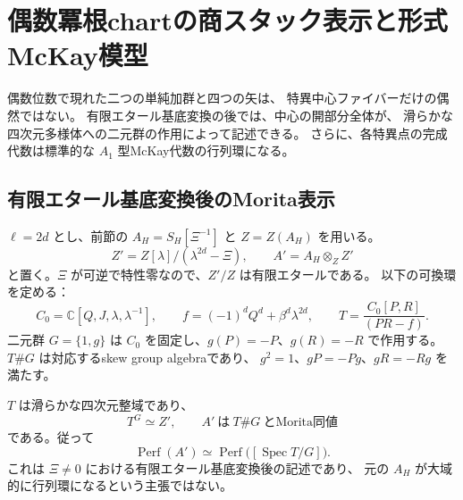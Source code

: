 \section{偶数冪根chartの商スタック表示と形式McKay模型}
\label{sec:root-McKay-v38}

偶数位数で現れた二つの単純加群と四つの矢は、
特異中心ファイバーだけの偶然ではない。
有限エタール基底変換の後では、中心の開部分全体が、
滑らかな四次元多様体への二元群の作用によって記述できる。
さらに、各特異点の完成代数は標準的な $A_1$ 型McKay代数の行列環になる。

\subsection{有限エタール基底変換後のMorita表示}

$\ell=2d$ とし、前節の $A_H=S_H[\Xi^{-1}]$ と $Z=Z(A_H)$ を用いる。
\[
 Z'=Z[\lambda]/(\lambda^{2d}-\Xi),\qquad
 A'=A_H\otimes_Z Z'
\]
と置く。$\Xi$ が可逆で特性零なので、$Z'/Z$ は有限エタールである。
以下の可換環を定める：
\begin{equation}
\label{eq:root-smooth-cover-v38}
 C_0=\mathbb C[Q,J,\lambda,\lambda^{-1}],\qquad
 f=(-1)^dQ^d+\beta^d\lambda^{2d},\qquad
 T=\frac{C_0[P,R]}{(PR-f)}.
\end{equation}
二元群 $G=\{1,g\}$ は $C_0$ を固定し、$g(P)=-P$、$g(R)=-R$ で作用する。
$T\#G$ は対応するskew group algebraであり、
$g^2=1$、$gP=-Pg$、$gR=-Rg$ を満たす。

\begin{theorem}[滑らかな二元群商による記述]
\label{thm:root-etale-Morita-v38}
$T$ は滑らかな四次元整域であり、
\[
 T^G\simeq Z',\qquad
 A'\ \text{は}\ T\#G\ \text{とMorita同値}
\]
である。従って
\[
 \operatorname{Perf}(A')\simeq
 \operatorname{Perf}\bigl([\operatorname{Spec}T/G]\bigr).
\]
これは $\Xi\ne0$ における有限エタール基底変換後の記述であり、
元の $A_H$ が大域的に行列環になるという主張ではない。
\end{theorem}

